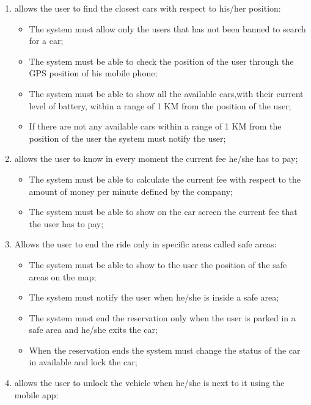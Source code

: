 \begin{enumerate}
\item allows the user to find the closest cars with respect to his/her position:

\begin{itemize}
\item The system must allow only the users that has not been banned to search for a car;
\item The system must be able to check the position of the user through the GPS position of his mobile phone;
\item The system must be able to show all the available cars,with their current level of battery, within a range of 1 KM from the position of the user;
\item If there are not any available cars within a range of 1 KM from the position of the user the system must notify the user;
\end{itemize}

\item allows the user to know in every moment the current fee he/she has to pay;

\begin{itemize}
\item The system must be able to calculate the current fee with respect to the amount of money per minute defined by the company;
\item The system must be able to show on the car screen the current fee that the user has to pay;
\end{itemize}

\item Allows the user to end the ride only in specific areas called safe areas:

\begin{itemize}
\item The system must be able to show to the user the position of the safe areas on the map;
\item The system must notify the user when he/she is inside a safe area;
\item The system must end the reservation only when the user is parked in a safe area and he/she exits the car;
\item When the reservation ends the system must change the status of the car in available and lock the car;
\end{itemize}

\item allows the user to unlock the vehicle when he/she is next to it using the mobile app:


\end{enumerate}

